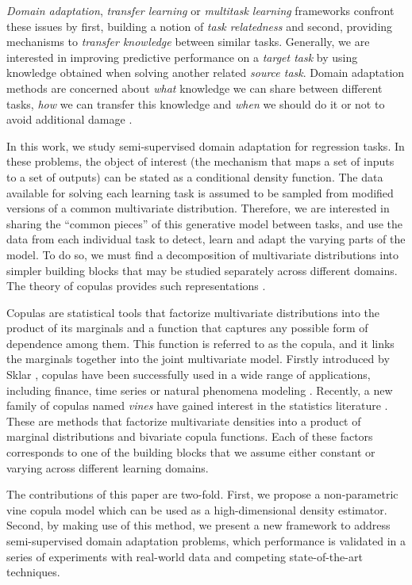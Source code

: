 \documentclass{article}
\begin{document}
\emph{Domain adaptation}, \emph{transfer learning} or \emph{multitask learning}
frameworks \cite{Mansour99,shai,Cortes11,survey} confront these issues by
first, building a notion of \emph{task relatedness} and second, providing
mechanisms to \emph{transfer knowledge} between similar tasks.  Generally, we
are interested in improving predictive performance on a \emph{target task} by
using knowledge obtained when solving another related \emph{source task}.
Domain adaptation methods are concerned about \emph{what} knowledge we can
share between different tasks, \emph{how} we can transfer this knowledge and
\emph{when} we should do it or not to avoid additional damage \cite{bin}.

In this work, we study semi-supervised domain adaptation for regression tasks.
In these problems, the object of interest (the mechanism that maps a set of
inputs to a set of outputs) can be stated as a conditional density function.
The data available for solving each learning task is assumed to be sampled from
modified versions of a common multivariate distribution. Therefore,  we are
interested in sharing the ``common pieces'' of this generative model between
tasks, and use the data from each individual task to detect, learn and adapt
the varying parts of the model. To do so, we must find a decomposition of
multivariate distributions into simpler building blocks that may be studied
separately across different domains.  The theory of copulas provides such
representations \cite{nelsen}.

Copulas are statistical tools that factorize multivariate distributions into
the product of its marginals and a function that captures any possible form of
dependence among them. This function is referred to as the copula, and it links
the marginals together into the joint multivariate model. Firstly introduced by
Sklar \cite{sklar}, copulas have been successfully used in a wide range of
applications, including finance, time series or natural phenomena modeling
\cite{copula_applications}.  Recently, a new family of copulas named
\emph{vines} have gained interest in the statistics literature \cite{vines}.
These are methods that factorize multivariate densities into a product of
marginal distributions and bivariate copula functions.  Each of these factors
corresponds to one of the building blocks that we assume either constant or
varying across different learning domains.

The contributions of this paper are two-fold. First, we propose a
non-parametric vine copula model which can be used as a high-dimensional
density estimator. Second, by making use of this method, we present a new
framework to address semi-supervised domain adaptation problems, which 
performance is validated in a series of experiments with real-world data and
competing state-of-the-art techniques.
\end{document}
